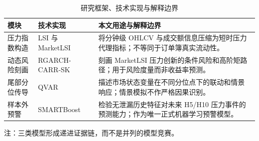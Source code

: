 \begin{table}[tbp]
\centering
\caption{研究框架、技术实现与解释边界}
\label{tab:model-framework}
\small
\begin{threeparttable}
\begin{tabularx}{\textwidth}{p{}p{}Y}
\toprule
模块 & 技术实现 & 本文用途与解释边界 \\
\midrule
压力指数构造 & LSI 与 MarketLSI & 将分钟级 OHLCV 与成交额信息压缩为短时压力代理指标；不等同于订单簿真实流动性。 \\
动态风险刻画 & \mbox{RGARCH-CARR-SK} & 刻画 MarketLSI 压力创新的条件风险和高阶矩路径；用于风险度量而非收益率预测。 \\
尾部分位传导 & QVAR & 描述市场状态变量在不同分位点下的联动和情景响应；情景模拟不作严格因果识别。 \\
样本外预警 & SMARTBoost & 检验无泄漏历史特征对未来 H5/H10 压力事件的预测能力；作为唯一正式机器学习预警模型。 \\
\bottomrule
\end{tabularx}
\begin{tablenotes}[flushleft]
\footnotesize
\item 注：三类模型形成递进证据链，而不是并列的模型竞赛。
\end{tablenotes}
\end{threeparttable}
\end{table}
